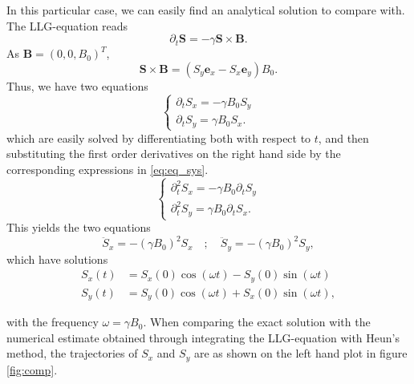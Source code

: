 In this particular case, we can easily find an analytical solution to compare with. The LLG-equation reads
\[
	\partial_t \mathbf{S} = -\gamma \mathbf{S} \times \mathbf{B}.
\]
As $\mathbf{B} = (0,0,B_0)^T$,
\[
	\mathbf{S} \times \mathbf{B} = (S_y \mathbf{e}_x - S_x \mathbf{e}_y) B_0.
\]
Thus, we have two equations 
\begin{equation}\label{eq:eq_sys}
	\begin{cases}
		\partial_t S_x = -\gamma B_0 S_y \\
		\partial_t S_y = \gamma B_0S_x.
	\end{cases}
\end{equation}
which are easily solved by differentiating both with respect to $t$, and then substituting the first order derivatives on the right hand side by the corresponding expressions in \ref{eq:eq_sys}.
\begin{equation}
	\begin{cases}
		\partial^2_t S_x = -\gamma B_0 \partial_t S_y  \\
		\partial^2_t S_y = \gamma B_0 \partial_t S_x.
	\end{cases}
\end{equation}
This yields the two equations
\begin{equation}
	\ddot{S}_x = - \left( \gamma B_0 \right)^2 S_x \quad;\quad \ddot{S}_y = - \left( \gamma B_0 \right)^2 S_y, 
\end{equation}
which have solutions 
\begin{align}
	S_x(t) &= S_x(0) \cos{(\omega t)} - S_y(0) \sin{(\omega t)} \label{eq:exact_1} \\
	S_y(t) &= S_y(0) \cos{(\omega t)} + S_x(0) \sin{(\omega t)} \label{eq:exact_2},
\end{align}

with the frequency $\omega = \gamma B_0$. When comparing the exact solution with the numerical estimate obtained through integrating the LLG-equation with Heun's method, the trajectories of $S_x$ and $S_y$ are as shown on the left hand plot in figure \ref{fig:comp}.


